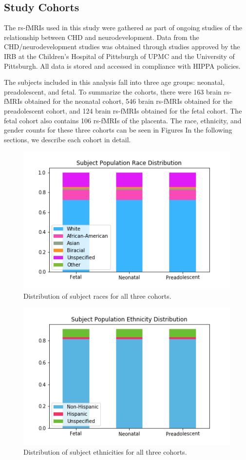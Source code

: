 \subsection{Study Cohorts}

The rs-fMRIs used in this study were gathered as part of ongoing studies of the relationship between CHD and neurodevelopment. Data from the CHD/neurodevelopment studies was obtained through studies approved by the IRB at the Children's Hospital of Pittsburgh of UPMC and the University of Pittsburgh. All data is stored and accessed in compliance with HIPPA policies.

The subjects included in this analysis fall into three age groups: neonatal, preadolescent, and fetal. To summarize the cohorts, there were 163 brain rs-fMRIs obtained for the neonatal cohort, 546 brain rs-fMRIs obtained for the preadolescent cohort, and 124 brain rs-fMRIs obtained for the fetal cohort. The fetal cohort also contains 106 rs-fMRIs of the placenta. The race, ethnicity, and gender counts for these three cohorts can be seen in Figures  In the following sections, we describe each cohort in detail. 

\begin{figure}
\centering
\includegraphics[width=.75\textwidth]{5/demo_clinical_subj_race.png}
\caption{Distribution of subject races for all three cohorts.}
\label{ch5:clinical:race}
\end{figure}%
%
\begin{figure}
\centering
\includegraphics[width=.75\textwidth]{5/demo_clinical_subj_ethnicity.png}
\caption{Distribution of subject ethnicities for all three cohorts.}
\label{ch5:clinical:eth}
\end{figure}


